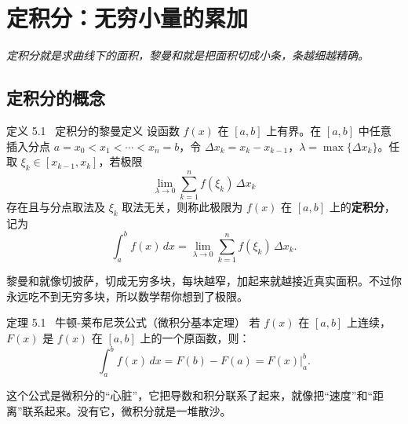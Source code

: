 \documentclass[12pt,a4paper]{article}
\newcommand{\humor}[1]{\par\smallskip\begin{humorbox}#1\end{humorbox}\smallskip}
\begin{document}
\newpage
\section{定积分：无穷小量的累加}
\begin{center}\textcolor{Sunshine}{\itshape 定积分就是求曲线下的面积，黎曼和就是把面积切成小条，条越细越精确。}\end{center}

\subsection{定积分的概念}

\begin{defbox}{定义 5.1 \ 定积分的黎曼定义}
设函数 $f(x)$ 在 $[a, b]$ 上有界。在 $[a,b]$ 中任意插入分点 $a = x_0 < x_1 < \cdots < x_n = b$，令 $\Delta x_k = x_k - x_{k-1}$，$\lambda = \max\{\Delta x_k\}$。任取 $\xi_k \in [x_{k-1}, x_k]$，若极限
\[
\lim_{\lambda \to 0} \sum_{k=1}^{n} f(\xi_k)\,\Delta x_k
\]
存在且与分点取法及 $\xi_k$ 取法无关，则称此极限为 $f(x)$ 在 $[a,b]$ 上的\textbf{定积分}，记为
\[
\int_a^b f(x)\,dx = \lim_{\lambda \to 0} \sum_{k=1}^{n} f(\xi_k)\,\Delta x_k.
\]
\end{defbox}
\humor{黎曼和就像切披萨，切成无穷多块，每块越窄，加起来就越接近真实面积。不过你永远吃不到无穷多块，所以数学帮你想到了极限。}

\begin{center}
\end{center}

\begin{thmbox}{定理 5.1 \ 牛顿-莱布尼茨公式（微积分基本定理）}
若 $f(x)$ 在 $[a,b]$ 上连续，$F(x)$ 是 $f(x)$ 在 $[a,b]$ 上的一个原函数，则：
\[
\int_a^b f(x)\,dx = F(b) - F(a) = F(x)\Big|_a^b.
\]
\end{thmbox}
\humor{这个公式是微积分的“心脏”，它把导数和积分联系了起来，就像把“速度”和“距离”联系起来。没有它，微积分就是一堆散沙。}
\end{document}
